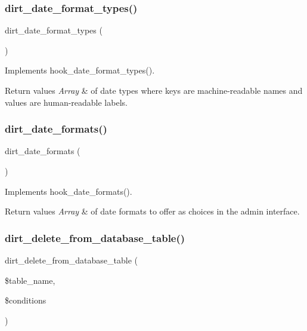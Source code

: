 \subsubsection{\texorpdfstring{dirt\+\_\+date\+\_\+format\+\_\+types()}{dirt\_date\_format\_types()}}
{\footnotesize\ttfamily dirt\+\_\+date\+\_\+format\+\_\+types (\begin{DoxyParamCaption}{ }\end{DoxyParamCaption})}

Implements hook\+\_\+date\+\_\+format\+\_\+types().


\begin{DoxyRetVals}{Return values}
{\em Array} & of date types where keys are machine-\/readable names and values are human-\/readable labels. \\
\hline
\end{DoxyRetVals}
\mbox{\label{dirt_8module_aa5bab157874401361d738401cefff845}} 
\subsubsection{\texorpdfstring{dirt\+\_\+date\+\_\+formats()}{dirt\_date\_formats()}}
{\footnotesize\ttfamily dirt\+\_\+date\+\_\+formats (\begin{DoxyParamCaption}{ }\end{DoxyParamCaption})}

Implements hook\+\_\+date\+\_\+formats().


\begin{DoxyRetVals}{Return values}
{\em Array} & of date formats to offer as choices in the admin interface. \\
\hline
\end{DoxyRetVals}
\mbox{\label{dirt_8module_a7bcf4d6f0f9a75ef750e7e90cef8fab4}} 
\subsubsection{\texorpdfstring{dirt\+\_\+delete\+\_\+from\+\_\+database\+\_\+table()}{dirt\_delete\_from\_database\_table()}}
{\footnotesize\ttfamily dirt\+\_\+delete\+\_\+from\+\_\+database\+\_\+table (\begin{DoxyParamCaption}\item[{}]{\$table\+\_\+name,  }\item[{}]{\$conditions }\end{DoxyParamCaption})}

